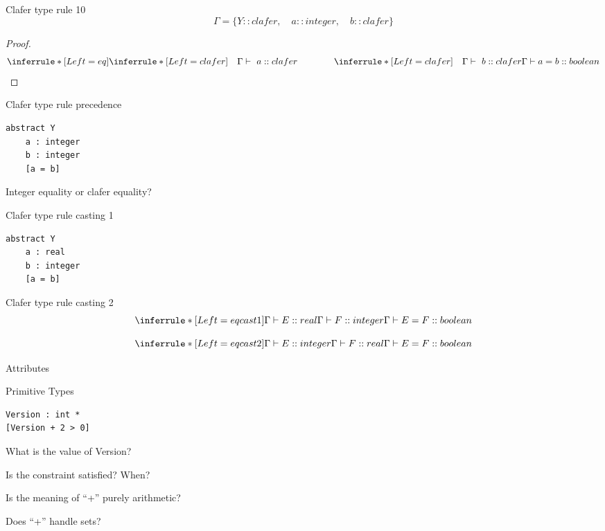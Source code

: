 \documentclass[table,15pt,t]{beamer}
\newcommand{\vmiddle}[1]{
  \vspace{\stretch{1}}
  #1
  \vspace{\stretch{1}}
}
\newcommand{\interframe}[1]{
\begin{frame}{}
\vmiddle{\hmiddle{\Huge #1}}
\end{frame}
}
\newcommand{\hmiddle}[1]{
  \begin{center}#1\end{center}
}
\begin{document}
\begin{frame}[fragile,c]{Clafer type rule 10}
\begin{equation*}
\Gamma = \{Y::clafer,\quad a::integer,\quad b::clafer\}
\end{equation*}

\begin{proof}
\begin{equation*}
\inferrule* [Left=eq] {
  \inferrule* [Left=clafer]{\quad}{\Gamma\vdash\ a::clafer} \\ \hspace{40pt} 
  \inferrule* [Left=clafer]{\quad}{\Gamma\vdash\ b::clafer}}
{\Gamma\vdash a = b::boolean}
\end{equation*}
\end{proof}
\end{frame}

\begin{frame}[fragile,c]{Clafer type rule precedence}
\begin{lstlisting}
abstract Y
    a : integer
    b : integer
    [a = b]
\end{lstlisting}

\vfill Integer equality or clafer equality?
\end{frame}

\begin{frame}[fragile,c]{Clafer type rule casting 1}
\begin{lstlisting}
abstract Y
    a : real
    b : integer
    [a = b]
\end{lstlisting}
\end{frame}

\begin{frame}[fragile,c]{Clafer type rule casting 2}
\begin{equation*}
\inferrule* [Left=eqcast1] {\Gamma\vdash E::real \\ \Gamma\vdash F::integer}{\Gamma\vdash E = F::boolean}
\end{equation*}

\begin{equation*}
\inferrule* [Left=eqcast2] {\Gamma\vdash E::integer \\ \Gamma\vdash F::real}{\Gamma\vdash E = F::boolean}
\end{equation*}
\end{frame}


\interframe{Attributes}

\begin{frame}[fragile,c]{Primitive Types}
\begin{lstlisting}
Version : int *
[Version + 2 > 0]
\end{lstlisting}\pause
\begin{list}{}{}
    \item What is the value of Version?\pause
    \item Is the constraint satisfied? When?\pause
    \item Is the meaning of ``+'' purely arithmetic?\pause
    \item Does ``+'' handle sets?
\end{list}
\end{frame}
\end{document}
